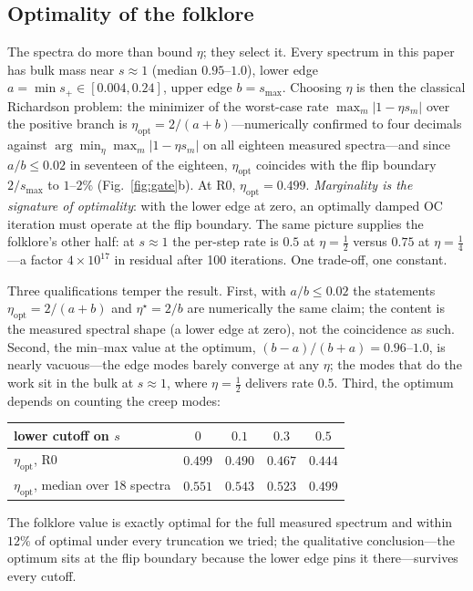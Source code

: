 \documentclass[11pt,a4paper]{article}
\newcommand{\smax}{s_{\max}}
\newcommand{\etastar}{\eta^{\star}}
\begin{document}
\subsection{Optimality of the folklore}\label{sec:richardson}

The spectra do more than bound $\eta$; they select it. Every spectrum in
this paper has bulk mass near $s\approx1$ (median $0.95$--$1.0$), lower
edge $a=\min s_{+}\in[0.004,0.24]$, upper edge $b=\smax$. Choosing
$\eta$ is then the classical Richardson problem: the minimizer of the
worst-case rate $\max_m|1-\eta s_m|$ over the positive branch is
$\eta_{\mathrm{opt}}=2/(a+b)$---numerically confirmed to four decimals
against $\arg\min_\eta\max_m|1-\eta s_m|$ on all eighteen measured
spectra---and since $a/b\le0.02$ in seventeen of the eighteen,
$\eta_{\mathrm{opt}}$ coincides with the flip boundary $2/\smax$ to
$1$--$2\%$ (Fig.~\ref{fig:gate}b). At R0, $\eta_{\mathrm{opt}}=0.499$.
\emph{Marginality is the signature of optimality}: with the lower edge
at zero, an optimally damped OC iteration must operate at the flip
boundary. The same picture supplies the folklore's other half: at
$s\approx1$ the per-step rate is $0.5$ at $\eta=\tfrac12$ versus $0.75$
at $\eta=\tfrac14$---a factor $4\times10^{17}$ in residual after 100
iterations. One trade-off, one constant.

Three qualifications temper the result. First, with $a/b\le0.02$ the
statements $\eta_{\mathrm{opt}}=2/(a+b)$ and $\etastar=2/b$ are
numerically the same claim; the content is the measured spectral shape
(a lower edge at zero), not the coincidence as such. Second, the
min--max value at the optimum, $(b-a)/(b+a)=0.96$--$1.0$, is nearly
vacuous---the edge modes barely converge at any $\eta$; the modes that
do the work sit in the bulk at $s\approx1$, where $\eta=\tfrac12$
delivers rate $0.5$. Third, the optimum depends on counting the creep
modes:
\begin{center}\small
\begin{tabular}{lcccc}
\toprule
lower cutoff on $s$ & $0$ & $0.1$ & $0.3$ & $0.5$ \\
\midrule
$\eta_{\mathrm{opt}}$, R0 & $0.499$ & $0.490$ & $0.467$ & $0.444$ \\
$\eta_{\mathrm{opt}}$, median over 18 spectra & $0.551$ & $0.543$
  & $0.523$ & $0.499$ \\
\bottomrule
\end{tabular}
\end{center} The folklore value is exactly
optimal for the full measured spectrum and within $12\%$ of optimal
under every truncation we tried; the qualitative conclusion---the
optimum sits at the flip boundary because the lower edge pins it
there---survives every cutoff.
\end{document}
